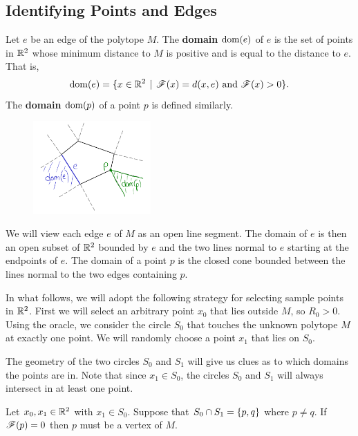 \documentclass[12pt]{article}
\begin{document}
\begin{flushleft}
\section{Identifying Points and Edges}

\begin{defn}
	Let $e$ be an edge of the polytope $M$.
	The \textbf{domain} $\text{dom}(e)$ of $e$ is the set of points in $\mathbb{R}^2$ whose minimum distance to $M$ is positive and is equal to the distance to $e$.
	That is,
	\[\text{dom}(e) = \{x\in\mathbb{R}^2 \hspace{4pt} | \hspace{4pt} \mathscr{F}(x) = d(x,e) \text{ and } \mathscr{F}(x)>0\}.\]
	The \textbf{domain} $\text{dom}(p)$ of a point $p$ is defined similarly.
\end{defn}

\begin{figure}[H]
	\centering
	\includegraphics[width=0.4\textwidth]{2.png}
\end{figure}

We will view each edge $e$ of $M$ as an open line segment.
The domain of $e$ is then an open subset of $\mathbb{R}^2$ bounded by $e$ and the two lines normal to $e$ starting at the endpoints of $e$.
The domain of a point $p$ is the closed cone bounded between the lines normal to the two edges containing $p$.

In what follows, we will adopt the following strategy for selecting sample points in $\mathbb{R}^2$.
First we will select an arbitrary point $x_0$ that lies outside $M$, so $R_0>0$.
Using the oracle, we consider the circle $S_0$ that touches the unknown polytope $M$ at exactly one point.
We will randomly choose a point $x_1$ that lies on $S_0$.

The geometry of the two circles $S_0$ and $S_1$ will give us clues as to which domains the points are in.
Note that since $x_1\in S_0$, the circles $S_0$ and $S_1$ will always intersect in at least one point.

\begin{prop}{2}
	Let $x_0,x_1\in \mathbb{R}^2$ with $x_1\in S_0$.
	Suppose that $S_0\cap S_1 = \{p,q\}$ where $p\neq q$.
	If $\mathscr{F}(p)=0$ then $p$ must be a vertex of $M$.
\end{prop}


\end{flushleft}
\end{document}
